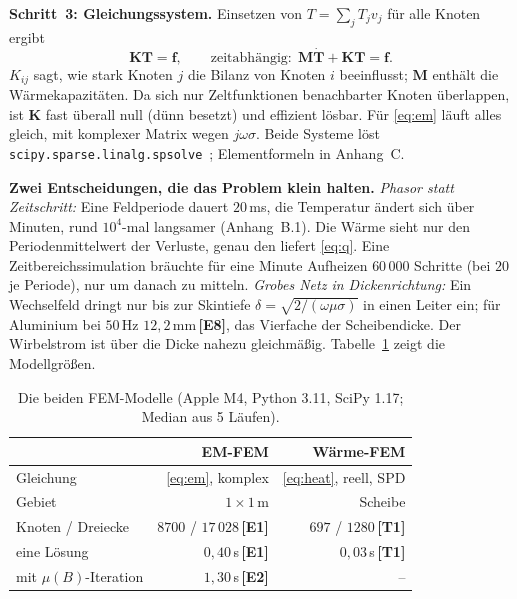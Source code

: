 \documentclass[a4paper, 10pt, conference]{ieeeconf}
\theoremstyle{remark}
\newcommand{\src}[1]{\,\textbf{[#1]}}
\begin{document}
\textbf{Schritt~3: Gleichungssystem.} Einsetzen von $T=\sum_jT_jv_j$ für
alle Knoten ergibt
\begin{equation}
  \mathbf K\mathbf T=\mathbf f,\qquad
  \text{zeitabhängig:}\ \ \mathbf M\dot{\mathbf T}+\mathbf K\mathbf T=\mathbf f .
  \label{eq:linsys}
\end{equation}
$K_{ij}$ sagt, wie stark Knoten $j$ die Bilanz von Knoten $i$ beeinflusst;
$\mathbf M$ enthält die Wärmekapazitäten. Da sich nur Zeltfunktionen
benachbarter Knoten überlappen, ist $\mathbf K$ fast überall null (dünn
besetzt) und effizient lösbar. Für \eqref{eq:em} läuft alles gleich, mit
komplexer Matrix wegen $j\omega\sigma$. Beide Systeme löst
\texttt{scipy.sparse.linalg.spsolve}~\cite{virtanen2020scipy}; Elementformeln
in Anhang~C.

\textbf{Zwei Entscheidungen, die das Problem klein halten.}
\emph{Phasor statt Zeitschritt:} Eine Feldperiode dauert $20\,$ms, die
Temperatur ändert sich über Minuten, rund $10^4$-mal langsamer
(Anhang~B.1). Die Wärme sieht nur den Periodenmittelwert der Verluste,
genau den liefert \eqref{eq:q}. Eine Zeitbereichssimulation bräuchte für
eine Minute Aufheizen $60\,000$ Schritte (bei $20$ je Periode), nur um
danach zu mitteln. \emph{Grobes Netz in Dickenrichtung:} Ein Wechselfeld
dringt nur bis zur Skintiefe $\delta=\sqrt{2/(\omega\mu\sigma)}$ in einen
Leiter ein; für Aluminium bei $50\,$Hz $12{,}2\,$mm\src{E8}, das Vierfache
der Scheibendicke. Der Wirbelstrom ist über die Dicke nahezu gleichmäßig.
Tabelle~\ref{tab:fem} zeigt die Modellgrößen.

\begin{table}[t]
\centering\footnotesize
\caption{Die beiden FEM-Modelle (Apple M4, Python 3.11, SciPy 1.17; Median aus 5 Läufen).}
\label{tab:fem}
\begin{tabular}{@{}lrr@{}}
\toprule
 & EM-FEM & Wärme-FEM \\
\midrule
Gleichung & \eqref{eq:em}, komplex & \eqref{eq:heat}, reell, SPD \\
Gebiet & $1\times1\,$m & Scheibe \\
Knoten / Dreiecke & $8700$ / $17\,028$\src{E1} & $697$ / $1280$\src{T1} \\
eine Lösung & $0{,}40\,$s\src{E1} & $0{,}03\,$s\src{T1} \\
mit $\mu(B)$-Iteration & $1{,}30\,$s\src{E2} & -- \\
\bottomrule
\end{tabular}
\end{table}
\end{document}
